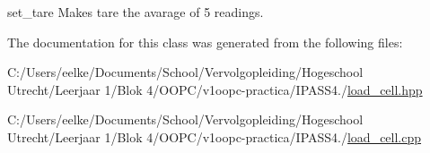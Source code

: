 set\+\_\+tare Makes tare the avarage of 5 readings. 



The documentation for this class was generated from the following files\+:\begin{DoxyCompactItemize}
\item 
C\+:/\+Users/eelke/\+Documents/\+School/\+Vervolgopleiding/\+Hogeschool Utrecht/\+Leerjaar 1/\+Blok 4/\+O\+O\+P\+C/v1oopc-\/practica/\+I\+P\+A\+S\+S4./\hyperlink{load__cell_8hpp}{load\+\_\+cell.\+hpp}\item 
C\+:/\+Users/eelke/\+Documents/\+School/\+Vervolgopleiding/\+Hogeschool Utrecht/\+Leerjaar 1/\+Blok 4/\+O\+O\+P\+C/v1oopc-\/practica/\+I\+P\+A\+S\+S4./\hyperlink{load__cell_8cpp}{load\+\_\+cell.\+cpp}\end{DoxyCompactItemize}
